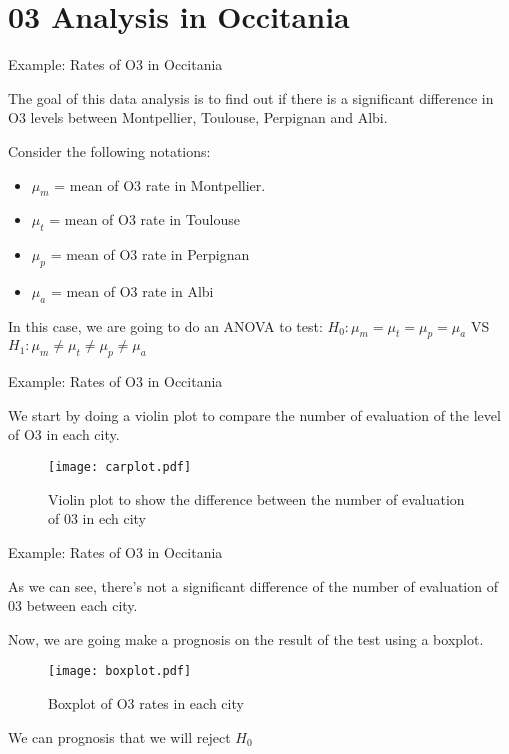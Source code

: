 \documentclass[unknownkeysallowed]{beamer}
\begin{document}
\section{03 Analysis in Occitania}
\begin{frame}{Example: Rates of O3 in Occitania}
	
	The goal of this data analysis is to find out if there is a significant difference in O3 levels between Montpellier, Toulouse, Perpignan and Albi. 
	
	\vspace{0.2cm}
	
	Consider the following notations:
	\begin{itemize}
		\item{$\mu_m$ = mean of O3 rate in Montpellier.}
		\item{$\mu_t$ = mean of O3 rate in Toulouse}
		\item{$\mu_p$ = mean of O3 rate in Perpignan}
		\item{$\mu_a$ = mean of O3 rate in Albi}
	\end{itemize}
	
	\vspace{0.2cm}
	
	In this case, we are going to do an ANOVA to test:
	$H_0:\mu_m=\mu_t=\mu_p=\mu_a$ VS $H_1:\mu_m \neq \mu_t \neq \mu_p \neq \mu_a$
\end{frame}

\begin{frame}{Example: Rates of O3 in Occitania}
	
	We start by doing a violin plot to compare the number of evaluation of the level of O3 in each city. 
	\begin{figure}
		\centering
		\texttt{[image: carplot.pdf]}
		\caption{Violin plot to show the difference between the number of evaluation of 03 in ech city}
		\label{fig:my_label}
	\end{figure}
\end{frame}

\begin{frame}{Example: Rates of O3 in Occitania}
	
	As we can see, there's not a significant difference of the number of evaluation of 03 between each city.
	
	Now, we are going make a prognosis on the result of the test using a boxplot.
	
	\begin{figure}
		\centering
		\texttt{[image: boxplot.pdf]}
		\caption{ Boxplot of O3 rates in each city}
		\label{fig:my_label}
	\end{figure}
	
	We can prognosis that we will reject $H_0$   
\end{frame}
\end{document}
